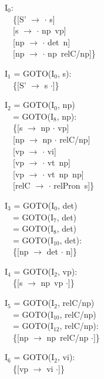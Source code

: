 \begin{figure}[htbp]
  \begin{center}
    {\small
      \begin{minipage}[t]{\mpw}
        I$_{0}$: \\
        　\{[S' $\to$ $\cdot$ s] \\
        　[s $\to$ $\cdot$ np\ vp] \\ 
        　[np $\to$ $\cdot$ det\ n] \\
        　[np $\to$ $\cdot$ np\ relC/np]\}

        \vspace{\vs}
        I$_{1}$ = GOTO(I$_{0}$, s): \\
        　\{[S' $\to$ s $\cdot$]\}

        \vspace{\vs}
        I$_{2}$ = GOTO(I$_{0}$, np) \\
        　= GOTO(I$_{8}$, np): \\
        　\{[s $\to$ np $\cdot$ vp] \\ 
        　[np $\to$ np $\cdot$ relC/np] \\
        　[vp $\to$ $\cdot$ vi] \\ 
        　[vp $\to$ $\cdot$ vt\ np] \\
        　[vp $\to$ $\cdot$ vt\ np\ np] \\
        　[relC $\to$ $\cdot$ relPron\ s]\}

        \vspace{\vs}
        I$_{3}$ = GOTO(I$_{0}$, det) \\
        　= GOTO(I$_{7}$, det) \\
        　= GOTO(I$_{8}$, det) \\
        　= GOTO(I$_{10}$, det): \\
        　\{[np $\to$ det $\cdot$ n]\}
      \end{minipage}
      \begin{minipage}[t]{\mpw}
        I$_{4}$ = GOTO(I$_{2}$, vp): \\
        　\{[s $\to$ np\ vp $\cdot$]\}

        \vspace{\vs}
        I$_{5}$ = GOTO(I$_{2}$, relC/np) \\
        　= GOTO(I$_{10}$, relC/np) \\
        　= GOTO(I$_{12}$, relC/np): \\
        　\{[np $\to$ np\ relC/np $\cdot$]\} 

        \vspace{\vs}
        I$_{6}$ = GOTO(I$_{2}$, vi): \\
        　\{[vp $\to$ vi $\cdot$]\}


\end{minipage}}
\end{center}
\end{figure}
